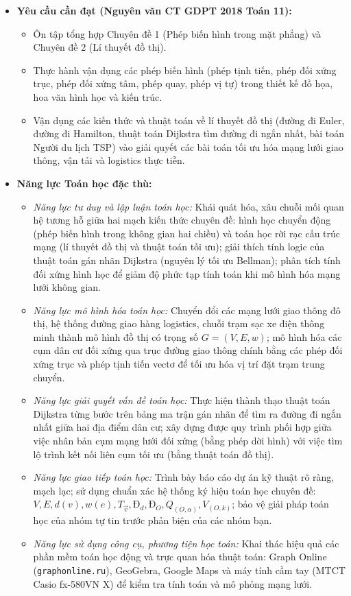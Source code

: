 \documentclass[12pt, a4paper]{article}
\renewcommand{\vec}[1]{\overrightarrow{#1}}
\begin{document}
\begin{itemize}[leftmargin=1.2cm]
    \item \textbf{Yêu cầu cần đạt (Nguyên văn CT GDPT 2018 Toán 11):}
    \begin{itemize}[leftmargin=0.6cm]
        \item Ôn tập tổng hợp Chuyên đề 1 (Phép biến hình trong mặt phẳng) và Chuyên đề 2 (Lí thuyết đồ thị).
        \item Thực hành vận dụng các phép biến hình (phép tịnh tiến, phép đối xứng trục, phép đối xứng tâm, phép quay, phép vị tự) trong thiết kế đồ họa, hoa văn hình học và kiến trúc.
        \item Vận dụng các kiến thức và thuật toán về lí thuyết đồ thị (đường đi Euler, đường đi Hamilton, thuật toán Dijkstra tìm đường đi ngắn nhất, bài toán Người du lịch TSP) vào giải quyết các bài toán tối ưu hóa mạng lưới giao thông, vận tải và logistics thực tiễn.
    \end{itemize}

    \item \textbf{Năng lực Toán học đặc thù:}
    \begin{itemize}[leftmargin=0.6cm]
        \item \textit{Năng lực tư duy và lập luận toán học:} Khái quát hóa, xâu chuỗi mối quan hệ tương hỗ giữa hai mạch kiến thức chuyên đề: hình học chuyển động (phép biến hình trong không gian hai chiều) và toán học rời rạc cấu trúc mạng (lí thuyết đồ thị và thuật toán tối ưu); giải thích tính logic của thuật toán gán nhãn Dijkstra (nguyên lý tối ưu Bellman); phân tích tính đối xứng hình học để giảm độ phức tạp tính toán khi mô hình hóa mạng lưới không gian.
        \item \textit{Năng lực mô hình hóa toán học:} Chuyển đổi các mạng lưới giao thông đô thị, hệ thống đường giao hàng logistics, chuỗi trạm sạc xe điện thông minh thành mô hình đồ thị có trọng số $G = (V, E, w)$; mô hình hóa các cụm dân cư đối xứng qua trục đường giao thông chính bằng các phép đối xứng trục và phép tịnh tiến vectơ để tối ưu hóa vị trí đặt trạm trung chuyển.
        \item \textit{Năng lực giải quyết vấn đề toán học:} Thực hiện thành thạo thuật toán Dijkstra từng bước trên bảng ma trận gán nhãn để tìm ra đường đi ngắn nhất giữa hai địa điểm dân cư; xây dựng được quy trình phối hợp giữa việc nhân bản cụm mạng lưới đối xứng (bằng phép dời hình) với việc tìm lộ trình kết nối liên cụm tối ưu (bằng thuật toán đồ thị).
        \item \textit{Năng lực giao tiếp toán học:} Trình bày báo cáo dự án kỹ thuật rõ ràng, mạch lạc; sử dụng chuẩn xác hệ thống ký hiệu toán học chuyên đề: $V, E, d(v), w(e), T_{\vec{v}}, Đ_d, Đ_O, Q_{(O, \alpha)}, V_{(O, k)}$; bảo vệ giải pháp toán học của nhóm tự tin trước phản biện của các nhóm bạn.
        \item \textit{Năng lực sử dụng công cụ, phương tiện học toán:} Khai thác hiệu quả các phần mềm toán học động và trực quan hóa thuật toán: Graph Online (\texttt{graphonline.ru}), GeoGebra, Google Maps và máy tính cầm tay (MTCT Casio fx-580VN X) để kiểm tra tính toán và mô phỏng mạng lưới.
    \end{itemize}


\end{itemize}
\end{document}
